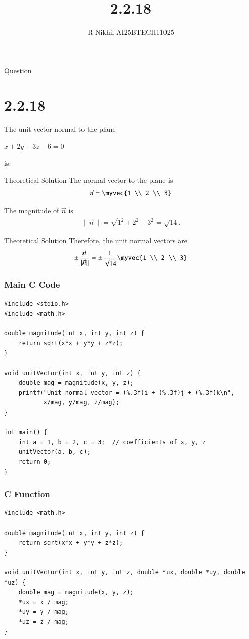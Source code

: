 \documentclass{beamer}
\title %
{2.2.18}
\author %
{R Nikhil-AI25BTECH11025}
\begin{document}
\frame{\titlepage}
\begin{frame}{Question}
\section*{2.2.18}
The unit vector normal to the plane 

$ x + 2y + 3z - 6 = 0 $

is:
\end{frame}

\begin{frame}{Theoretical Solution}
The normal vector to the plane is 
\begin{align}
\vec{n} = \myvec {1 \\ 2 \\ 3} 
\end{align}

The magnitude of $\vec{n}$ is
\begin{align}
\|\vec{n}\| = \sqrt{1^2 + 2^2 + 3^2} = \sqrt{14}.
\end{align}
\end{frame}

\begin{frame}{Theoretical Solution}
Therefore, the unit normal vectors are
\begin{align}
\pm \frac{\vec{n}}{\|\vec{n}\|}
= \pm \frac{1}{\sqrt{14}}
\myvec {1 \\ 2 \\ 3}
\end{align}

\end{frame}

\begin{frame}[fragile]
\frametitle{Main C Code}
   \begin{lstlisting}
#include <stdio.h>
#include <math.h>

double magnitude(int x, int y, int z) {
    return sqrt(x*x + y*y + z*z);
}

void unitVector(int x, int y, int z) {
    double mag = magnitude(x, y, z);
    printf("Unit normal vector = (%.3f)i + (%.3f)j + (%.3f)k\n", 
           x/mag, y/mag, z/mag);
}

int main() {
    int a = 1, b = 2, c = 3;  // coefficients of x, y, z
    unitVector(a, b, c);
    return 0;
}

   \end{lstlisting}
	\end{frame}

\begin{frame}[fragile]
\frametitle{C Function}
   \begin{lstlisting}
#include <math.h>

double magnitude(int x, int y, int z) {
    return sqrt(x*x + y*y + z*z);
}

void unitVector(int x, int y, int z, double *ux, double *uy, double *uz) {
    double mag = magnitude(x, y, z);
    *ux = x / mag;
    *uy = y / mag;
    *uz = z / mag;
}

\end{lstlisting}
\end{frame}
\end{document}

